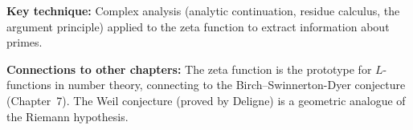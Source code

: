 \noindent\textbf{Key technique:} Complex analysis (analytic continuation, residue calculus, the argument principle) applied to the zeta function to extract information about primes.

\noindent\textbf{Connections to other chapters:} The zeta function is the prototype for $L$-functions in number theory, connecting to the Birch--Swinnerton-Dyer conjecture (Chapter~7). The Weil conjecture (proved by Deligne) is a geometric analogue of the Riemann hypothesis.
